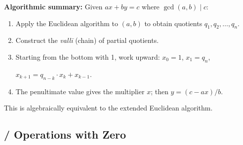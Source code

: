 \documentclass[10pt,a4paper]{article}
\newenvironment{engcommentary}
\newcommand{\bilingualverse}[2]{%

\noindent\begin{minipage}[t]{0.47\textwidth}

\dev{#1}

\end{minipage}%

\hfill\vline\hfill%

\begin{minipage}[t]{0.47\textwidth}

#2

\end{minipage}\par\vspace{0.8em}%

}
\begin{document}
\vspace{1.5em}



\begin{engcommentary}

\textbf{Algorithmic summary:} Given $ax + by = c$ where $\gcd(a,b) \mid c$:

\begin{enumerate}

\item Apply the Euclidean algorithm to $(a, b)$ to obtain quotients $q_1, q_2, \dots, q_n$.

\item Construct the \textit{vallī} (chain) of partial quotients.

\item Starting from the bottom with 1, work upward: $x_0 = 1$, $x_1 = q_n$,

$x_{k+1} = q_{n-k} \cdot x_k + x_{k-1}$.

\item The penultimate value gives the multiplier $x$; then $y = (c - ax)/b$.

\end{enumerate}

This is algebraically equivalent to the extended Euclidean algorithm.

\end{engcommentary}



\subsection*{ / Operations with Zero}






\begin{minipage}[t]{0.47\textwidth}


\end{minipage}%
\end{document}
